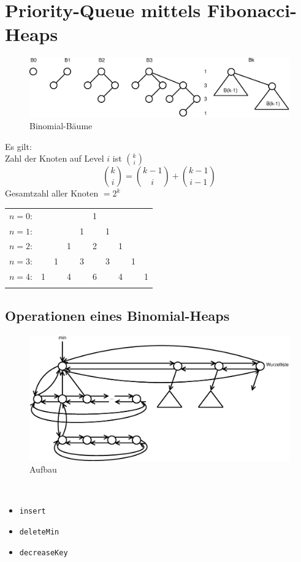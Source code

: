 \chapter{Priority-Queue mittels Fibonacci-Heaps}
\begin{figure}[h]
	\centering
	\includegraphics[width=0.65\linewidth]{21/Grafik/BinomialBaeume}
	\caption{Binomial-Bäume}
\end{figure}

Es gilt:\\
Zahl der Knoten auf Level $i$ ist $\binom{k}{i}$
\[  \binom{k}{i} = \binom{k-1}{i} + \binom{k-1}{i-1} \]
Gesamtzahl aller Knoten $=2^k$\\

\begin{tabular}{rccccccccc}
$n=0$:&    &    &    &    &  1\\\noalign{\smallskip\smallskip}
$n=1$:&    &    &    &  1 &    &  1\\\noalign{\smallskip\smallskip}
$n=2$:&    &    &  1 &    &  2 &    &  1\\\noalign{\smallskip\smallskip}
$n=3$:&    &  1 &    &  3 &    &  3 &    &  1\\\noalign{\smallskip\smallskip}
$n=4$:&  1 &    &  4 &    &  6 &    &  4 &    &  1\\\noalign{\smallskip\smallskip}
\end{tabular}


\section{Operationen eines Binomial-Heaps}

\begin{figure}[h]
	\centering
	\includegraphics[width=0.65\linewidth]{21/Grafik/Aufbau}
	\caption{Aufbau}
\end{figure}
$ $\\
\begin{itemize}
	\item \texttt{insert}
	\item \texttt{deleteMin}
	\item \texttt{decreaseKey}
\end{itemize}

